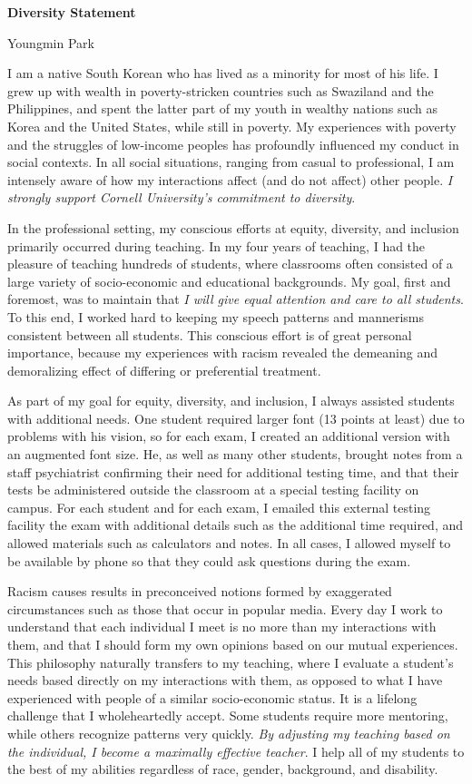 \documentclass[a4paper,11pt]{article}
\begin{document}
\begin{center}
\Large \textbf{Diversity Statement}

\Large Youngmin Park
\end{center}

I am a native South Korean who has lived as a minority for most of his life. I grew up with wealth in poverty-stricken countries such as Swaziland and the Philippines, and spent the latter part of my youth in wealthy nations such as Korea and the United States, while still in poverty. My experiences with poverty and the struggles of low-income peoples has profoundly influenced my conduct in social contexts. In all social situations, ranging from casual to professional, I am intensely aware of how my interactions affect (and do not affect) other people. \textit{I strongly support Cornell University's commitment to diversity}.

In the professional setting, my conscious efforts at equity, diversity, and inclusion primarily occurred during teaching. In my four years of teaching, I had the pleasure of teaching hundreds of students, where classrooms often consisted of a large variety of socio-economic and educational backgrounds. My goal, first and foremost, was to maintain that \textit{I will give equal attention and care to all students}. To this end, I worked hard to keeping my speech patterns and mannerisms consistent between all students. This conscious effort is of great personal importance, because my experiences with racism revealed the demeaning and demoralizing effect of differing or preferential treatment.

As part of my goal for equity, diversity, and inclusion, I always assisted students with additional needs. One student required larger font (13 points at least) due to problems with his vision, so for each exam, I created an additional version with an augmented font size. He, as well as many other students, brought notes from a staff psychiatrist confirming their need for additional testing time, and that their tests be administered outside the classroom at a special testing facility on campus. For each student and for each exam, I emailed this external testing facility the exam with additional details such as the additional time required, and allowed materials such as calculators and notes. In all cases, I allowed myself to be available by phone so that they could ask questions during the exam.

Racism causes results in preconceived notions formed by exaggerated circumstances such as those that occur in popular media. Every day I work to understand that each individual I meet is no more than my interactions with them, and that I should form my own opinions based on our mutual experiences. This philosophy naturally transfers to my teaching, where I evaluate a student's needs based directly on my interactions with them, as opposed to what I have experienced with people of a similar socio-economic status. It is a lifelong challenge that I wholeheartedly accept. Some students require more mentoring, while others recognize patterns very quickly. \textit{By adjusting my teaching based on the individual, I become a maximally effective teacher}. I help all of my students to the best of my abilities regardless of race, gender, background, and disability.
\end{document}
